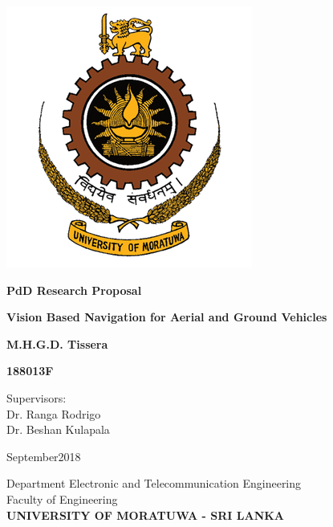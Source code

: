 \begin{titlepage}
	\begin{center}
		\includegraphics[scale=0.5]{uom}
		
		\vspace*{1cm}
		\Large
		\textbf{PdD Research Proposal}
		
		\vspace*{2cm}
		\Huge
		\textbf{Vision Based Navigation for Aerial and Ground Vehicles }
		
		\vspace{1cm}
		\large
		\textbf{M.H.G.D. Tissera}
		
		\vspace{1cm}
		\large
		\textbf{188013F}
		
		\vspace{1.5cm}
		\normalsize
		Supervisors:\\
		Dr. Ranga Rodrigo\\
		Dr. Beshan Kulapala
		
		\vfill
		September2018
		
		\vspace{0.8cm}
		\large
		Department Electronic and Telecommunication Engineering\\
		Faculty of Engineering\\
		\large
		\textbf{UNIVERSITY OF MORATUWA - SRI LANKA}
		
	\end{center}
\end{titlepage}
